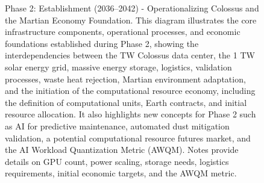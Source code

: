 \documentclass[fontsize=10pt, oneside, DIV=calc]{scrartcl}
\begin{document}
\begin{figure}[H]
  \centering
  \noindent
  \begin{minipage}{\textwidth}
    \centering
    \caption{Phase 2: Establishment (2036–2042) - Operationalizing Colossus and the Martian Economy Foundation. This diagram illustrates the core infrastructure components, operational processes, and economic foundations established during Phase 2, showing the interdependencies between the TW Colossus data center, the 1 TW solar energy grid, massive energy storage, logistics, validation processes, waste heat rejection, Martian environment adaptation, and the initiation of the computational resource economy, including the definition of computational units, Earth contracts, and initial resource allocation. It also highlights new concepts for Phase 2 such as AI for predictive maintenance, automated dust mitigation validation, a potential computational resource futures market, and the AI Workload Quantization Metric (AWQM). Notes provide details on GPU count, power scaling, storage needs, logistics requirements, initial economic targets, and the AWQM metric.}
  \end{minipage}
\end{figure}
\end{document}
